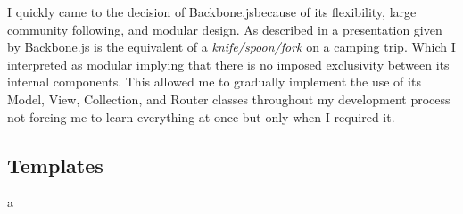 \documentclass[final]{cmpreport}
\begin{document}

I quickly came to the decision of Backbone.js\footnotemark[26] because of its flexibility, large community following, and modular design. As described in a presentation given by \citet{Bull} Backbone.js is the equivalent of a \textit{knife/spoon/fork} on a camping trip. Which I interpreted as modular implying that there is no imposed exclusivity between its internal components. This allowed me to gradually implement the use of its Model, View, Collection, and Router classes throughout my development process not forcing me to learn everything at once but only when I required it.


\subsection{Templates}
a
\end{document}

